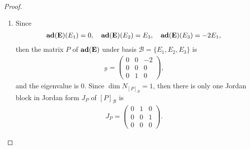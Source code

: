 \documentclass[11pt]{article}
\theoremstyle{definition}
\numberwithin{equation}{subsection}
\begin{document}
\begin{proof}
\begin{enumerate}[label=(\alph*)]
    \item Since 
    \begin{align*}
        {\bf ad}({\bf E})(E_1) = 0, \quad {\bf ad}({\bf E})(E_2) = E_3, \quad {\bf ad}({\bf E})(E_3) = -2E_1,
    \end{align*}
    then the matrix $P$ of ${\bf ad}({\bf E})$ under basis $\mathcal{B} = \{E_1, E_2, E_3\}$ is 
    \begin{align*}
        [P]_{\mathcal{B}} = \begin{pmatrix}
            0 & 0 & -2 \\
            0 & 0 & 0 \\
            0 & 1 & 0
        \end{pmatrix},
    \end{align*}
    and the eigenvalue is $0$. Since $\dim N_{[P]_{\mathcal{B}}} = 1$, then there is only one Jordan block in Jordan form $J_P$ of $[P]_{\mathcal{B}}$ is
    \begin{align*}
        J_P = \begin{pmatrix}
            0 & 1 & 0 \\
            0 & 0 & 1 \\
            0 & 0 & 0
        \end{pmatrix}.
    \end{align*}
\end{enumerate}
\end{proof}

\medskip
\end{document}
